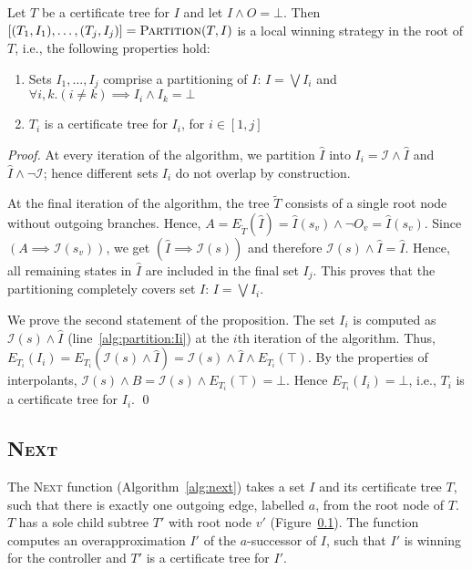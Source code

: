 \begin{proposition}
    Let $T$ be a certificate tree for $I$ and let $I\land O =\bot$.  Then
    $[(T_1,I_1),\ldots,(T_j, I_j)] = \textsc{Partition}(T, I)$
    is a local winning strategy in the root of $T$, i.e., the
    following properties hold:
    \begin{enumerate}
        \item Sets $I_1,\ldots,I_j$ comprise a partitioning of
            $I$: $I=\bigvee I_i$ and $\forall i, k. (i\neq k)
            \implies I_i\land I_k=\bot$
        \item $T_i$ is a certificate tree for $I_i$, for
            $i\in[1,j]$
    \end{enumerate}
\end{proposition}
\begin{proof}
    At every iteration of the algorithm, we partition $\hat{I}$
    into $I_i = \mathcal{I} \land\hat{I}$ and
    $\hat{I} \land \neg\mathcal{I}$; hence different sets $I_i$ do
    not overlap by construction.

    At the final iteration of the algorithm, the tree $\tilde{T}$
    consists of a single root node without outgoing branches.
    Hence, $A = E_{\tilde{T}}(\hat{I}) = \hat{I}(s_v) \land \neg O_v =
    \hat{I}(s_v)$.  Since $(A\implies \mathcal{I}(s_v))$, we get $(\hat{I} \implies \mathcal{I}(s))$
    and therefore $\mathcal{I}(s) \land \hat{I} = \hat{I}$.  Hence, all remaining states
    in $\hat{I}$ are included in the final set $I_j$.  This proves that
    the partitioning completely covers set $I$: $I=\bigvee I_i$.

    We prove the second statement of the proposition.  The set $I_i$ is computed as
    $\mathcal{I}(s) \land \hat{I}$ (line~\ref{alg:partition:Ii}) at the $i$th iteration of the algorithm.
    Thus, $E_{T_i}(I_i) = E_{T_i}(\mathcal{I}(s) \land \hat{I}) = \mathcal{I}(s) \land \hat{I} \land E_{T_i}(\top)$.
    By the properties of interpolants, $\mathcal{I}(s) \land B = \mathcal{I}(s) \land E_{T_i}(\top) = \bot$.
    Hence $E_{T_i}(I_i) = \bot$, i.e., $T_i$ is a certificate tree for $I_i$.
    \qed
\end{proof}

\subsection{\textsc{Next}}

The \textsc{Next} function (Algorithm~\ref{alg:next}) takes a set $I$ and its certificate tree $T$, such
that there is exactly one outgoing edge, labelled $a$, from the root node of $T$.
$T$ has a sole child subtree $T'$ with root node $v'$ (Figure~\ref{}).
The function computes an overapproximation $I'$ of the $a$-successor of $I$,
such that $I'$ is winning for the controller and $T'$ is a certificate tree for $I'$.

